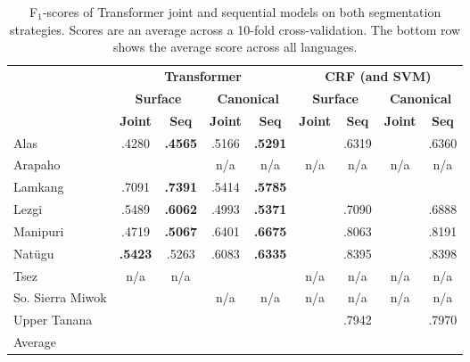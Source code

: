 \begin{table}[!tb]
    \centering
    \begin{tabular}{l|cc|cc|cc|cc}
          & \multicolumn{4}{c|}{\textbf{Transformer}} & \multicolumn{4}{c}{\textbf{CRF (and SVM)}} 
          \\
          & \multicolumn{2}{c|}{\textbf{Surface}} & \multicolumn{2}{c|}{\textbf{Canonical}}  & \multicolumn{2}{c|}{\textbf{Surface}} & \multicolumn{2}{c}{\textbf{Canonical}} 
          \\
          &  \textbf{Joint} & \textbf{Seq} &  \textbf{Joint} & \textbf{Seq} &  \textbf{Joint} & \textbf{Seq} &  \textbf{Joint} & \textbf{Seq} \\
         \hline
         Alas & .4280 & \textbf{.4565} & .5166 & \textbf{.5291} &  & .6319 &  & .6360 \\
         \hline
         Arapaho &  &  & n/a & n/a & n/a & n/a & n/a & n/a  \\
         \hline
         Lamkang & .7091 & \textbf{.7391} & .5414 & \textbf{.5785} &  &  &  &  \\
         \hline
         Lezgi & .5489 & \textbf{.6062} & .4993 & \textbf{.5371} &  & .7090 &  & .6888 \\
         \hline
         Manipuri & .4719 & \textbf{.5067} & .6401 & \textbf{.6675} &  & .8063 &  & .8191 \\
         \hline
         Natügu & \textbf{.5423} & .5263 & .6083 & \textbf{.6335 } &  & .8395 &  & .8398 \\
         \hline
         Tsez & n/a & n/a &  &  & n/a & n/a & n/a & n/a \\
         \hline
         So. Sierra Miwok &  &  & n/a & n/a & n/a & n/a & n/a & n/a \\
         \hline
         Upper Tanana &  &  &  &  &  & .7942 &  & .7970 \\
         \hline
         \hline
         Average &  &  &  &  &  &  &  &  \\
    \end{tabular}
    \caption[Results of Transformer on Joint and Sequential models]{F$_1$-scores of Transformer joint and sequential models on both segmentation strategies. Scores are an average across a 10-fold cross-validation. The bottom row shows the average score across all languages.}
    \label{tab:allresults}
\end{table}


